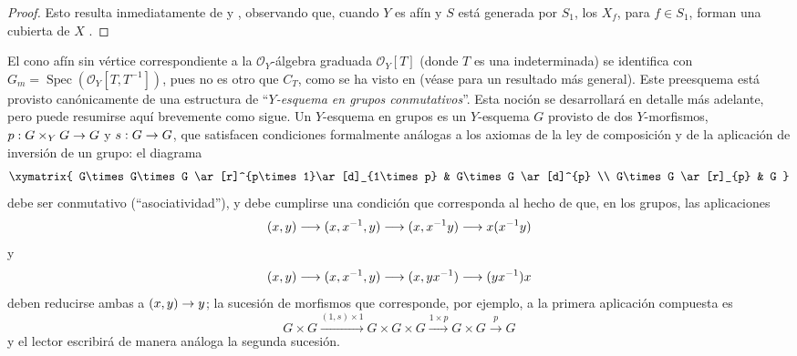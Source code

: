 \documentclass[oneside,10pt]{amsart}
\makeatletter
\newcommand{\ega@arrow}[2]{\mathchoice{#1}{#2}{#2}{#2}}
\renewcommand{\to}{\ega@arrow{\longrightarrow}{\rightarrow}}
\let\EGAOriginalLabel\label
\renewcommand{\label}[1]{\phantomsection\EGAOriginalLabel{#1}}
\makeatother
\begin{document}
\begin{proof}
Esto resulta inmediatamente de  y , observando que, cuando $Y$ es afín y $S$ está generada por $S_1$, los $X_f$, para $f\in S_1$, forman una cubierta de $X$ .
\end{proof}
\begin{remark}[8.3.9]
\label{II.8.3.9-fr}
El cono afín sin vértice correspondiente a la $\mathcal{O}_Y$-álgebra graduada $\mathcal{O}_Y[T]$ (donde $T$ es una indeterminada) se identifica con $G_m=\operatorname{Spec}(\mathcal{O}_Y[T,T^{-1}])$, pues no es otro que $C_T$, como se ha visto en  (véase  para un resultado más general).
Este preesquema está provisto canónicamente de una estructura de \textquotedblleft\emph{$Y$-esquema en grupos conmutativos}\textquotedblright.
Esta noción se desarrollará en detalle más adelante, pero puede resumirse aquí brevemente como sigue.
Un $Y$-esquema en grupos es un $Y$-esquema $G$ provisto de dos $Y$-morfismos, $p:G\times_YG\to G$ y $s:G\to G$, que satisfacen condiciones formalmente análogas a los axiomas de la ley de composición y de la aplicación de inversión de un grupo: el diagrama
\[
  \xymatrix{
    G\times G\times G \ar[r]^{p\times1}\ar[d]_{1\times p}
      & G\times G \ar[d]^{p} \\
    G\times G \ar[r]_{p} & G
  }
\]
debe ser conmutativo (\textquotedblleft asociatividad\textquotedblright), y debe cumplirse una condición que corresponda al hecho de que, en los grupos, las aplicaciones
\[
  (x,y)\to(x,x^{-1},y)\to(x,x^{-1}y)\to x(x^{-1}y)
\]
y
\[
  (x,y)\to(x,x^{-1},y)\to(x,yx^{-1})\to(yx^{-1})x
\]
deben reducirse ambas a $(x,y)\to y$;
la sucesión de morfismos que corresponde, por ejemplo, a la primera aplicación compuesta es
\[
  G\times G\xrightarrow{(1,s)\times1}G\times G\times G
  \xrightarrow{1\times p}G\times G\xrightarrow{p}G
\]
y el lector escribirá de manera análoga la segunda sucesión.


\end{remark}
\end{document}
